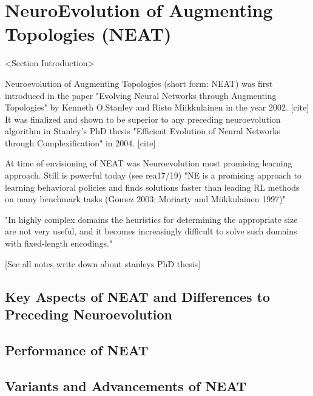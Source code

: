 \documentclass[journal, a4paper]{IEEEtran}
\begin{document}

\section{NeuroEvolution of Augmenting Topologies (NEAT)}

<Section Introduction>

Neuroevolution of Augmenting Topologies (short form: NEAT) was first introduced in the paper "Evolving Neural Networks through Augmenting Topologies" by Kenneth O.Stanley and Risto Miikkulainen in the year 2002. [cite] It was finalized and shown to be superior to any preceding neuroevolution algorithm in Stanley's PhD thesis "Efficient Evolution of Neural Networks through Complexification" in 2004. [cite]



At time of envisioning of NEAT was Neuroevolution most promising learning approach. Still is powerful today (see rea17/19)
"NE is a promising approach to learning behavioral policies and finds solutions faster than leading RL methods on many benchmark tasks (Gomez 2003; Moriarty and Miikkulainen 1997)" \cite{sta04}


"In highly complex domains the heuristics for determining the appropriate size are not very useful, and it becomes increasingly difficult to solve such domains with fixed-length encodings." \cite{sta04}

[See all notes write down about stanleys PhD thesis]




\subsection{Key Aspects of NEAT and Differences to Preceding Neuroevolution}

\subsection{Performance of NEAT}

\subsection{Variants and Advancements of NEAT}
\end{document}
